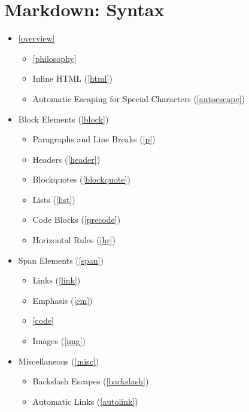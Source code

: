 \part{Markdown: Syntax }
\label{markdown:syntax}

\begin{itemize}
\item \autoref{overview}

\begin{itemize}
\item \autoref{philosophy}

\item Inline HTML (\autoref{html})

\item Automatic Escaping for Special Characters (\autoref{autoescape})

\end{itemize}

\item Block Elements (\autoref{block})

\begin{itemize}
\item Paragraphs and Line Breaks (\autoref{p})

\item Headers (\autoref{header})

\item Blockquotes (\autoref{blockquote})

\item Lists (\autoref{list})

\item Code Blocks (\autoref{precode})

\item Horizontal Rules (\autoref{hr})

\end{itemize}

\item Span Elements (\autoref{span})

\begin{itemize}
\item Links (\autoref{link})

\item Emphasis (\autoref{em})

\item \autoref{code}

\item Images (\autoref{img})

\end{itemize}

\item Miscellaneous (\autoref{misc})

\begin{itemize}
\item Backslash Escapes (\autoref{backslash})

\item Automatic Links (\autoref{autolink})

\end{itemize}

\end{itemize}

